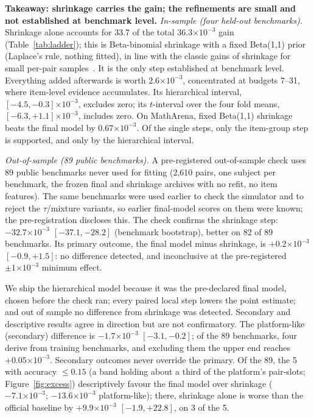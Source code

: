 \documentclass{article}
\newcommand{\ee}[1]{\ensuremath{\times 10^{-#1}}}
\begin{document}
\textbf{Takeaway: shrinkage carries the gain; the refinements are small and not established at benchmark level.}
\emph{In-sample (four held-out benchmarks).} Shrinkage alone accounts for 33.7 of the total $36.3\ee{3}$ gain
(Table~\ref{tab:ladder}); this is Beta-binomial shrinkage with a fixed Beta(1,1) prior (Laplace's rule, nothing
fitted), in line with the classic gains of shrinkage for small per-pair samples~\cite{efron1975,brown2008}. It is the
only step established at benchmark level. Everything added afterwards is worth $2.6\ee{3}$, concentrated at budgets
7--31, where item-level evidence accumulates. Its hierarchical interval, $[-4.5, -0.3]\ee{3}$, excludes zero; its
$t$-interval over the four fold means, $[-6.3, +1.1]\ee{3}$, includes zero. On MathArena, fixed Beta(1,1) shrinkage beats the
final model by $0.67\ee{3}$. Of the single steps, only the item-group step is supported, and only by the hierarchical
interval.

\emph{Out-of-sample (89 public benchmarks).} A pre-registered out-of-sample check uses 89 public benchmarks never used
for fitting (2{,}610 pairs, one subject per benchmark, the frozen final and shrinkage archives with no refit, no
item features). The same benchmarks were
used earlier to check the simulator and to reject the $\tau$/mixture variants, so earlier final-model scores on them
were known; the pre-registration discloses this. The check confirms the shrinkage step: $-32.7\ee{3}$ $[-37.1, -28.2]$ (benchmark
bootstrap), better on 82 of 89 benchmarks. Its primary outcome, the final model minus shrinkage, is $+0.2\ee{3}$
$[-0.9, +1.5]$: no difference detected, and inconclusive at the pre-registered $\pm1\ee{3}$ minimum effect.

We ship the hierarchical model because it was the pre-declared final model, chosen before the check ran; every paired
local step lowers the point estimate; and out of sample no difference from shrinkage was detected. Secondary and
descriptive results agree in direction but are not confirmatory. The platform-like (secondary) difference is
$-1.7\ee{3}$ $[-3.1, -0.2]$; of the 89 benchmarks, four derive from training benchmarks, and excluding them the upper
end reaches $+0.05\ee{3}$. Secondary outcomes never override the primary. Of the 89, the 5 with accuracy
$\le 0.15$ (a band holding about a third of the platform's pair-slots; Figure~\ref{fig:excess}) descriptively favour
the final model over shrinkage ($-7.1\ee{3}$; $-13.6\ee{3}$ platform-like); there, shrinkage alone is worse than the
official baseline by $+9.9\ee{3}$ $[-1.9, +22.8]$, on 3 of the 5.
\end{document}
